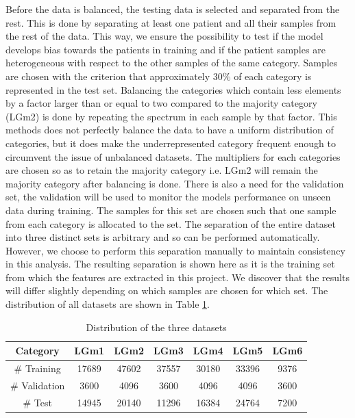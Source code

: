 Before the data is balanced, the testing data is selected and separated from the rest. This is done by separating at least one patient and all their samples from the rest of the data. This way, we ensure the possibility to test if the model develops bias towards the patients in training and if the patient samples are heterogeneous with respect to the other samples of the same category. Samples are chosen with the criterion that approximately $30\%$ of each category is represented in the test set. Balancing the categories which contain less elements by a factor larger than or equal to two compared to the majority category (LGm2) is done by repeating the spectrum in each sample by that factor. This methods does not perfectly balance the data to have a uniform distribution of categories, but it does make the underrepresented category frequent enough to circumvent the issue of unbalanced datasets. The multipliers for each categories are chosen so as to retain the majority category i.e. LGm2 will remain the majority category after balancing is done. There is also a need for the validation set, the validation will be used to monitor the models performance on unseen data during training. The samples for this set are chosen such that one sample from each category is allocated to the set. The separation of the entire dataset into three distinct sets is arbitrary and so can be performed automatically. However, we choose to perform this separation manually to maintain consistency in this analysis. The resulting separation is shown here as it is the training set from which the features are extracted in this project. We discover that the results will differ slightly depending on which samples are chosen for which set. The distribution of all datasets are shown in Table \ref{table:2}.

\begin{table}[H]
\centering
 \begin{tabular}{||c c c c c c c||} 
 \hline
 Category & LGm1 & LGm2 & LGm3 & LGm4 & LGm5 & LGm6 \\ [0.5ex] 
 \hline\hline
 \# Training & 17689 & 47602 & 37557 & 30180 & 33396 & 9376 \\
 \hline 
 \# Validation & 3600 & 4096 & 3600 & 4096 & 4096 & 3600 \\
 \hline
 \# Test & 14945 & 20140 & 11296 & 16384 & 24764 & 7200 \\
 \hline

\end{tabular}
\caption{Distribution of the three datasets}
\label{table:2}
\end{table}

